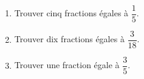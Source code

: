 \documentclass[exercice]{thedocument}%
\begin{document}
%
\begin{enumerate}
    \item Trouver cinq fractions égales à $\dfrac15$.
    \item Trouver dix fractions égales à $\dfrac3{18}$.
    \item Trouver une fraction égale à $\dfrac35$.
\end{enumerate}
\end{document}
